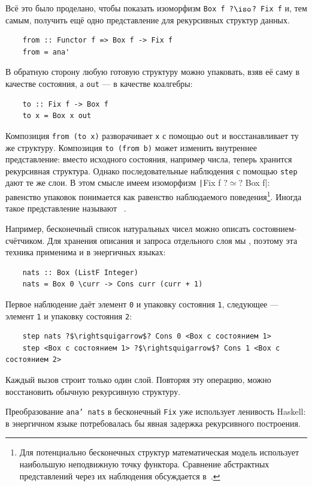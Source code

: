 Всё это было проделано, чтобы показать изоморфизм \texttt{Box f ?$\iso$? Fix f} и, тем самым, получить ещё одно представление для рекурсивных структур данных.
\begin{verbatim}
    from :: Functor f => Box f -> Fix f
    from = ana'
\end{verbatim}
В обратную сторону любую готовую структуру можно упаковать, взяв её саму в качестве состояния, а \texttt{out} --- в качестве коалгебры:
\begin{verbatim}
    to :: Fix f -> Box f
    to x = Box x out
\end{verbatim}
Композиция \texttt{from (to x)} разворачивает \texttt{x} с помощью \texttt{out} и восстанавливает ту же структуру.
Композиция \texttt{to (from b)} может изменить внутреннее представление: вместо исходного состояния, например числа, теперь хранится рекурсивная структура.
Однако последовательные наблюдения с помощью \texttt{step} дают те же слои.
В этом смысле имеем изоморфизм \texttt|Fix f ?$\simeq$? Box f|: равенство упаковок понимается как равенство наблюдаемого поведения\footnote{Для потенциально бесконечных структур математическая модель использует наибольшую неподвижную точку функтора. Сравнение абстрактных представлений через их наблюдения обсуждается в~\cite{gibbons2008unfolding}.}.
Иногда такое представление называют ~\cite{gibbons2008unfolding}.

Например, бесконечный список натуральных чисел можно описать состоянием-счётчиком.
Для хранения описания и запроса отдельного слоя мы , поэтому эта техника применима и в энергичных языках:
\begin{verbatim}
    nats :: Box (ListF Integer)
    nats = Box 0 \curr -> Cons curr (curr + 1)
\end{verbatim}
Первое наблюдение даёт элемент \texttt{0} и упаковку состояния \texttt{1}, следующее --- элемент \texttt{1} и упаковку состояния \texttt{2}:
\begin{verbatim}
    step nats ?$\rightsquigarrow$? Cons 0 <Box с состоянием 1>
    step <Box с состоянием 1> ?$\rightsquigarrow$? Cons 1 <Box с состоянием 2>
\end{verbatim}
Каждый вызов строит только один слой.
Повторяя эту операцию, можно восстановить обычную рекурсивную структуру.

Преобразование \texttt{ana' nats} в бесконечный \texttt{Fix} уже использует ленивость Haskell: в энергичном языке потребовалась бы явная задержка рекурсивного построения.

